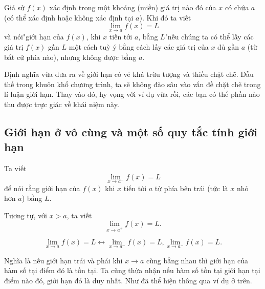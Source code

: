 \begin{definition}
    Giả sử $f(x)$ xác định trong một khoảng (miền) giá trị nào đó của $x$ có chứa $a$ (có thể xác định hoặc không xác định tại $a$). Khi đó ta viết
    \begin{equation*}\lim_{x\rightarrow a}f(x)=L\end{equation*}
và nói\qquad\qquad\qquad "giới hạn của $f(x)$, khi $x$ tiến tới $a$, bằng $L$"\newline nếu chúng ta có thể lấy các giá trị $f(x)$ gần $L$ một cách tuỳ ý bằng cách lấy các giá trị của $x$ đủ gần $a$ (từ bất cứ phía nào), nhưng không được bằng $a$.
\end{definition}

Định nghĩa vừa đưa ra về giới hạn có vẻ khá trừu tượng và thiếu chặt chẽ. Dẫu thế trong khuôn khổ chương trình, ta sẽ không đào sâu vào vấn đề chặt chẽ trong lí luận giới hạn. Thay vào đó, hy vọng với ví dụ vừa rồi, các bạn có thể phần nào thu được trực giác về khái niệm này.\newline
\subsection{Giới hạn ở vô cùng và một số quy tắc tính giới hạn}
\begin{definition}
    Ta viết \begin{equation*}\lim_{x\rightarrow a^-}f(x)=L\end{equation*}
để nói rằng giới hạn của $f(x)$ khi $x$ tiến tới $a$ từ phía bên trái (tức là $x$ nhỏ hơn $a$) bằng $L$. 
\end{definition}

Tương tự, với $x>a$, ta viết $$\lim_{x\rightarrow a^+}f(x)=L .$$ 
\begin{theorem}
    \begin{equation*}\lim_{x\rightarrow a}f(x)=L \leftrightarrow \lim_{x\rightarrow a^-}f(x)=L, \lim_{x\rightarrow a^-}f(x)=L.\end{equation*}   
\end{theorem}

Nghĩa là nếu giới hạn trái và phái khi $x\rightarrow a$ cùng bằng nhau thì giới hạn của hàm số tại điểm đó là tồn tại.
Ta cũng thừa nhận nếu hàm số tồn tại giới hạn tại điểm nào đó, giới hạn đó là duy nhất. Như đã thể hiện thông qua ví dụ ở trên.


